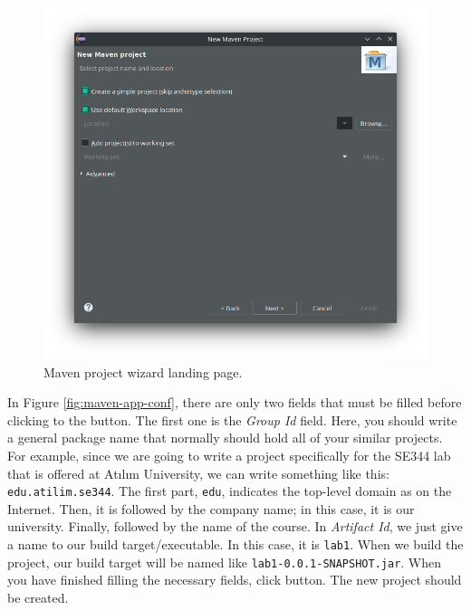 \begin{figure}[H]
    \centering
    \includegraphics[width=\textwidth]{images/maven-new.png}
    \caption{Maven project wizard landing page.}
    \label{fig:maven-new}
\end{figure}

In Figure \ref{fig:maven-app-conf}, there are only two fields that must be filled before clicking to the  button. The first one is the \emph{Group Id} field. Here, you should write a general package name that normally should hold all of your similar projects. For example, since we are going to write a project specifically for the SE344 lab that is offered at Atılım University, we can write something like this: \lstinline|edu.atilim.se344|. The first part, \lstinline|edu|, indicates the top-level domain as on the Internet. Then, it is followed by the company name; in this case, it is our university. Finally, followed by the name of the course. In \emph{Artifact Id}, we just give a name to our build target/executable. In this case, it is \lstinline|lab1|. When we build the project, our build target will be named like \lstinline[language={}]|lab1-0.0.1-SNAPSHOT.jar|. When you have finished filling the necessary fields, click  button. The new project should be created.

